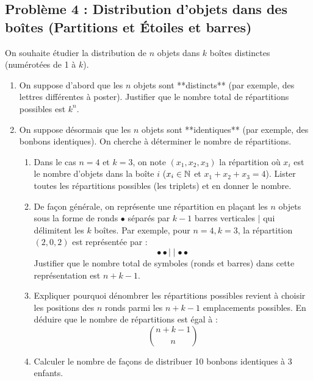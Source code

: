 \subsection*{Problème 4 : Distribution d'objets dans des boîtes (Partitions et Étoiles et barres)}
On souhaite étudier la distribution de $n$ objets dans $k$ boîtes distinctes (numérotées de 1 à $k$).
\begin{enumerate}
    \item On suppose d'abord que les $n$ objets sont **distincts** (par exemple, des lettres différentes à poster).
    Justifier que le nombre total de répartitions possibles est $k^n$.
    
    \item On suppose désormais que les $n$ objets sont **identiques** (par exemple, des bonbons identiques). On cherche à déterminer le nombre de répartitions.
    \begin{enumerate}
        \item Dans le cas $n=4$ et $k=3$, on note $(x_1, x_2, x_3)$ la répartition où $x_i$ est le nombre d'objets dans la boîte $i$ ($x_i \in \mathbb{N}$ et $x_1+x_2+x_3=4$).
        Lister toutes les répartitions possibles (les triplets) et en donner le nombre.
        
        \item De façon générale, on représente une répartition en plaçant les $n$ objets sous la forme de ronds $\bullet$ séparés par $k-1$ barres verticales $|$ qui délimitent les $k$ boîtes.
        Par exemple, pour $n=4, k=3$, la répartition $(2, 0, 2)$ est représentée par :
        \[
        \bullet \bullet \mid \mid \bullet \bullet
        \]
        Justifier que le nombre total de symboles (ronds et barres) dans cette représentation est $n+k-1$.
        
        \item Expliquer pourquoi dénombrer les répartitions possibles revient à choisir les positions des $n$ ronds parmi les $n+k-1$ emplacements possibles. En déduire que le nombre de répartitions est égal à :
        \[
        \binom{n+k-1}{n}
        \]
        
        \item Calculer le nombre de façons de distribuer 10 bonbons identiques à 3 enfants.
    \end{enumerate}
\end{enumerate}

